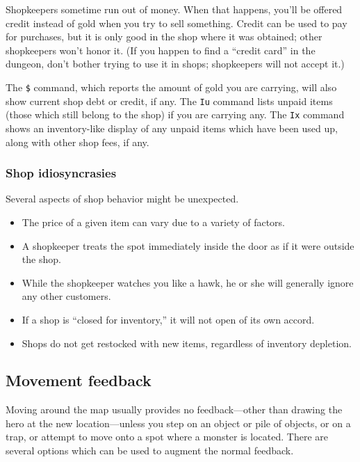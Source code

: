 \documentclass[titlepage]{article}
\begin{document}
Shopkeepers sometime run out of money.
When that happens, you'll be
offered credit instead of gold when you try to sell something.
Credit can be used to pay for purchases, but it is only good in the shop
where it was obtained; other shopkeepers won't honor it.
(If you happen to
find a ``credit card'' in the dungeon, don't bother trying to use it in
shops; shopkeepers will not accept it.)

The \texttt{\$} command, which reports the amount of gold you are carrying,
will also show current shop debt or credit, if any.
The \texttt{Iu} command lists unpaid items (those which still belong to the
shop) if you are carrying any.
The \texttt{Ix} command shows an inventory-like display of any unpaid items
which have been used up, along with other shop fees, if any.

\subsubsection*{Shop idiosyncrasies}

Several aspects of shop behavior might be unexpected.

\begin{itemize}
\item
The price of a given item can vary due to a variety of factors.
\item
A shopkeeper treats the spot immediately inside the door as if it were
outside the shop.
\item
While the shopkeeper watches you like a hawk, he or she will generally ignore
any other customers.
\item
If a shop is ``closed for inventory,'' it will not open of its own accord.
\item
Shops do not get restocked with new items, regardless of inventory depletion.
\end{itemize}

\subsection*{Movement feedback}

Moving around the map usually provides no
feedback---other than drawing the hero at the new location---unless
you step on an object or pile of objects,
or on a trap, or attempt to move onto a spot where a monster is located.
There are several options which can be used to augment the normal feedback.
\end{document}
